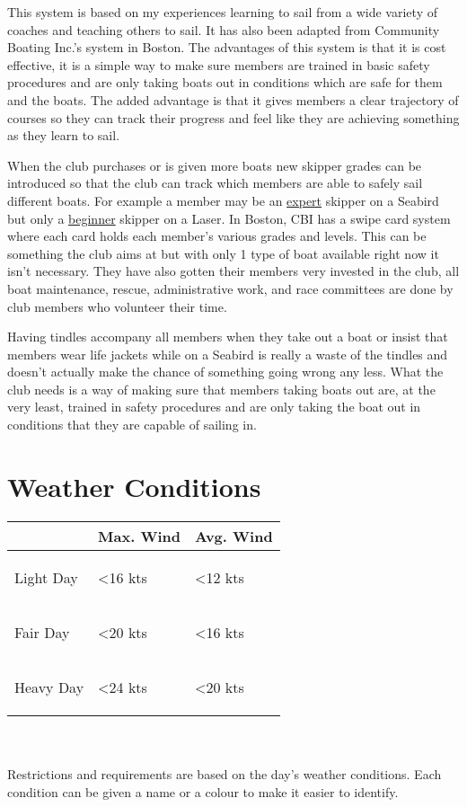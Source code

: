\documentclass[12pt]{scrartcl}
\begin{document}
This system is based on my experiences learning to sail from a wide variety of coaches and teaching others to sail. It has also been adapted from Community Boating Inc.’s system in Boston. The advantages of this system is that it is cost effective, it is a simple way to make sure members are trained in basic safety procedures and are only taking boats out in conditions which are safe for them and the boats. The added advantage is that it gives members a clear trajectory of courses so they can track their progress and feel like they are achieving something as they learn to sail.

When the club purchases or is given more boats new skipper grades can be introduced so that the club can track which members are able to safely sail different boats. For example a member may be an \hyperlink{grade:expert}{expert} skipper on a Seabird but only a \hyperlink{grade:beginner}{beginner} skipper on a Laser. In Boston, CBI has a swipe card system where each card holds each member’s various grades and levels. This can be something the club aims at but with only 1 type of boat available right now it isn’t necessary. They have also gotten their members very invested in the club, all boat maintenance, rescue, administrative work, and race committees are done by club members who volunteer their time.

Having tindles accompany all members when they take out a boat or insist that members wear life jackets while on a Seabird is really a waste of the tindles and doesn’t actually make the chance of something going wrong any less. What the club needs is a way of making sure that members taking boats out are, at the very least, trained in safety procedures and are only taking the boat out in conditions that they are capable of sailing in.

\newpage

\section{Weather Conditions} \label{sec:weather conditions}

\label{tab:weather conditions}
\begin{tabularx}{\textwidth}{|X|X|X|}
	\hline
	& Max. Wind & Avg. Wind \\
	\hline
	\hypertarget{condition:light day}{Light Day} & \textless 16 kts & \textless 12 kts \\
	\hline
	\hypertarget{condition:fair day}{Fair Day} & \textless 20 kts & \textless 16 kts \\
	\hline
	\hypertarget{condition:heavy day}{Heavy Day} & \textless 24 kts & \textless 20 kts \\
	\hline
\end{tabularx}
\\
\\
Restrictions and requirements are based on the day’s weather conditions. Each condition can be given a name or a colour to make it easier to identify.
\end{document}
